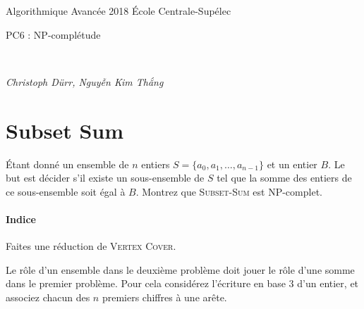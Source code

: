 \documentclass[12pt]{article}
\newcommand{\MakeScribeTop}[1]{
\noindent
\begin{framed}
\noindent
 Algorithmique Avancée 2018
 \hfill
 École Centrale-Supélec
 \\[1em]
 \centerline{ \Large
#1
 }
 \\[1em]
\centerline{  \it Christoph Dürr, Nguyễn Kim Thắng}
\end{framed}
}
\begin{document}
    \MakeScribeTop{PC6 : NP-complétude}


\section{Subset Sum}

Étant donné un ensemble de $n$ entiers $S=\{a_0, a_1, \ldots, a_{n-1}\}$ et un entier $B$. 
Le but est décider s'il existe un sous-ensemble de $S$ tel que la somme des entiers de ce sous-ensemble soit égal à $B$.
Montrez que \textsc{Subset-Sum} est NP-complet. 

\paragraph{Indice} 
Faites une réduction de \textsc{Vertex Cover}.  

Le rôle d'un ensemble dans le deuxième problème doit jouer le rôle d'une somme dans le premier problème. Pour cela considérez l'écriture en base $3$ d'un entier, et associez chacun des $n$ premiers chiffres à une arête.  

%
\end{document}
